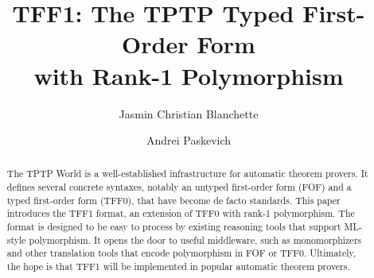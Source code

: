 \documentclass[a4paper]{llncs}
\begin{document}
\title{
TFF1: The TPTP Typed First-Order Form \\ with Rank-1
Polymorphism}

\author{
Jasmin Christian Blanchette \and
Andrei Paskevich
}


\maketitle

\setcounter{footnote}{0}

\begin{abstract}
The TPTP World is a well-established infrastructure for automatic theorem
provers. It defines several concrete syntaxes,
notably an untyped first-order form (FOF) and a typed first-order form (TFF0),
that have become de facto standards.
This paper introduces the TFF1 format, an extension of TFF0 with
rank-1 polymorphism. The format is designed to be
easy to process by existing reasoning tools that support ML-style polymorphism.
It opens the door to useful middleware, such as monomorphizers and other
translation tools that encode polymorphism in FOF or TFF0. Ultimately, the hope
is that TFF1 will be implemented in popular automatic theorem provers.
\end{abstract}









\end{document}
